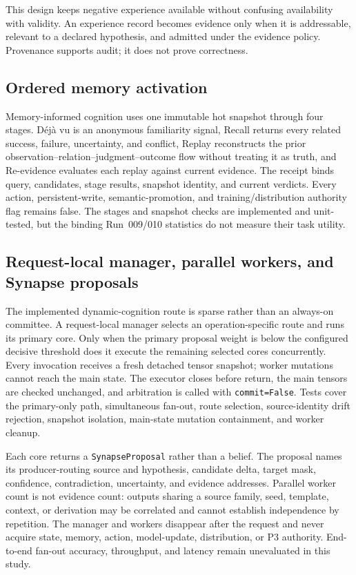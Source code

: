 \documentclass[10pt]{article}
\newcommand{\code}[1]{\texttt{#1}}
\begin{document}
This design keeps negative experience available without confusing availability with validity. An experience record becomes evidence only when it is addressable, relevant to a declared hypothesis, and admitted under the evidence policy. Provenance supports audit; it does not prove correctness.

\subsection{Ordered memory activation}

Memory-informed cognition uses one immutable hot snapshot through four stages. D\'ej\`a vu is an anonymous familiarity signal, Recall returns every related success, failure, uncertainty, and conflict, Replay reconstructs the prior observation--relation--judgment--outcome flow without treating it as truth, and Re-evidence evaluates each replay against current evidence. The receipt binds query, candidates, stage results, snapshot identity, and current verdicts. Every action, persistent-write, semantic-promotion, and training/distribution authority flag remains false. The stages and snapshot checks are implemented and unit-tested, but the binding Run~009/010 statistics do not measure their task utility.

\subsection{Request-local manager, parallel workers, and Synapse proposals}

The implemented dynamic-cognition route is sparse rather than an always-on committee. A request-local manager selects an operation-specific route and runs its primary core. Only when the primary proposal weight is below the configured decisive threshold does it execute the remaining selected cores concurrently. Every invocation receives a fresh detached tensor snapshot; worker mutations cannot reach the main state. The executor closes before return, the main tensors are checked unchanged, and arbitration is called with \code{commit=False}. Tests cover the primary-only path, simultaneous fan-out, route selection, source-identity drift rejection, snapshot isolation, main-state mutation containment, and worker cleanup.

Each core returns a \code{SynapseProposal} rather than a belief. The proposal names its producer-routing source and hypothesis, candidate delta, target mask, confidence, contradiction, uncertainty, and evidence addresses. Parallel worker count is not evidence count: outputs sharing a source family, seed, template, context, or derivation may be correlated and cannot establish independence by repetition. The manager and workers disappear after the request and never acquire state, memory, action, model-update, distribution, or P3 authority. End-to-end fan-out accuracy, throughput, and latency remain unevaluated in this study.
\end{document}
